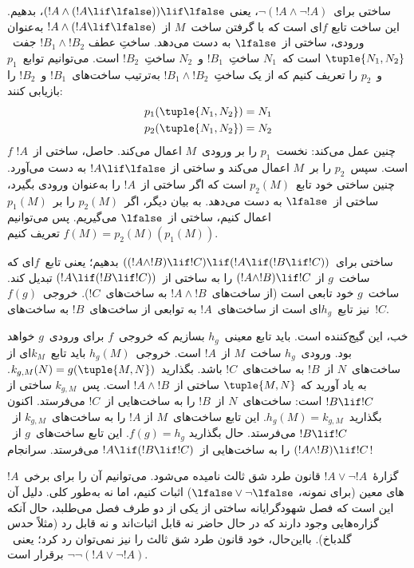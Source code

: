 \documentclass[../../../include/open-logic-section]{subfiles}
\begin{document}
\begin{ex}
ساختی برای~$\lnot(!A \land \lnot !A)$، یعنی
$(!A \land (!A \lif \lfalse)) \lif \lfalse$، بدهیم. این ساخت تابع
$f$ای است که با گرفتن ساخت~$M$ از~$!A \land (!A \lif \lfalse)$
به‌عنوان ورودی، ساختی از~$\lfalse$ به دست می‌دهد. ساختِ عطف
$!B_1 \land !B_2$ جفت~$\tuple{N_1, N_2}$ است که~$N_1$ ساختِ~$!B_1$
و~$N_2$ ساختِ~$!B_2$ است. می‌توانیم توابع~$p_1$ و~$p_2$ را تعریف
کنیم که از یک ساختِ~$!B_1 \land !B_2$ به‌ترتیب ساخت‌های~$!B_1$ و~$!B_2$
را بازیابی کنند:
\begin{align*}
  p_1(\tuple{N_1, N_2}) &= N_1\\
  p_2(\tuple{N_1, N_2}) &= N_2
\end{align*}
$f$ چنین عمل می‌کند: نخست~$p_1$ را بر ورودی~$M$ اعمال می‌کند. حاصل،
ساختی از~$!A$ است. سپس~$p_2$ را بر~$M$ اعمال می‌کند و ساختی از
$!A \lif \lfalse$ به دست می‌آورد. چنین ساختی خود تابع~$p_2(M)$ است
که اگر ساختی از~$!A$ را به‌عنوان ورودی بگیرد، ساختی از~$\lfalse$ به
دست می‌دهد. به بیان دیگر، اگر~$p_2(M)$ را بر~$p_1(M)$ اعمال کنیم،
ساختی از~$\lfalse$ می‌گیریم. پس می‌توانیم
$f(M) = p_2(M)(p_1(M))$ تعریف کنیم.
\end{ex}

\begin{ex}
ساختی برای~$((!A \land !B) \lif !C) \lif (!A \lif
(!B \lif !C))$ بدهیم؛ یعنی تابع~$f$ای که ساخت~$g$ از
$(!A \land !B) \lif !C$ را به ساختی از~$(!A \lif (!B \lif !C))$
تبدیل کند. ساخت~$g$ خود تابعی است (از ساخت‌های~$!A \land !B$ به
ساخت‌های~$!C$). خروجی~$f(g)$ نیز تابع~$h_g$ای است از ساخت‌های~$!A$
به توابعی از ساخت‌های~$!B$ به ساخت‌های~$!C$.

خب، این گیج‌کننده است. باید تابع معینی~$h_g$ بسازیم که خروجی~$f$ برای
ورودی~$g$ خواهد بود. ورودی~$h_g$ ساخت~$M$ از~$!A$ است. خروجی~$h_g(M)$
باید تابع~$k_M$ای از ساخت‌های~$N$ از~$!B$ به ساخت‌های~$!C$ باشد.
بگذارید~$k_{g,M}(N) = g(\tuple{M, N})$. به یاد آورید که
$\tuple{M, N}$ ساختی از~$!A \land !B$ است. پس~$k_{g,M}$ ساختی از
$!B \lif !C$ است: ساخت‌های~$N$ از~$!B$ را به ساخت‌هایی از~$!C$
می‌فرستد. اکنون بگذارید~$h_g(M) = k_{g,M}$. این تابع ساخت‌های~$M$ از
$!A$ را به ساخت‌های~$k_{g,M}$ از~$!B \lif !C$ می‌فرستد. حال بگذارید
$f(g) = h_g$. این تابع ساخت‌های~$g$ از~$(!A \land !B) \lif !C$ را به
ساخت‌هایی از~$!A \lif (!B \lif !C)$ می‌فرستد. سرانجام!{}
\end{ex}

گزارهٔ~$!A \lor \lnot !A$ قانون طرد شق ثالث نامیده می‌شود. می‌توانیم
آن را برای برخی~$!A$های معین (برای نمونه،
$\lfalse \lor \lnot \lfalse$) اثبات کنیم، اما نه به‌طور کلی. دلیل آن
این است که فصل شهودگرایانه ساختی از یکی از دو طرف فصل می‌طلبد، حال آنکه
گزاره‌هایی وجود دارند که در حال حاضر نه قابل اثبات‌اند و نه قابل رد
(مثلاً حدس گلدباخ). بااین‌حال، خود قانون طرد شق ثالث را نیز نمی‌توان رد
کرد؛ یعنی~$\lnot \lnot (!A \lor \lnot !A)$ برقرار است.
\end{document}
